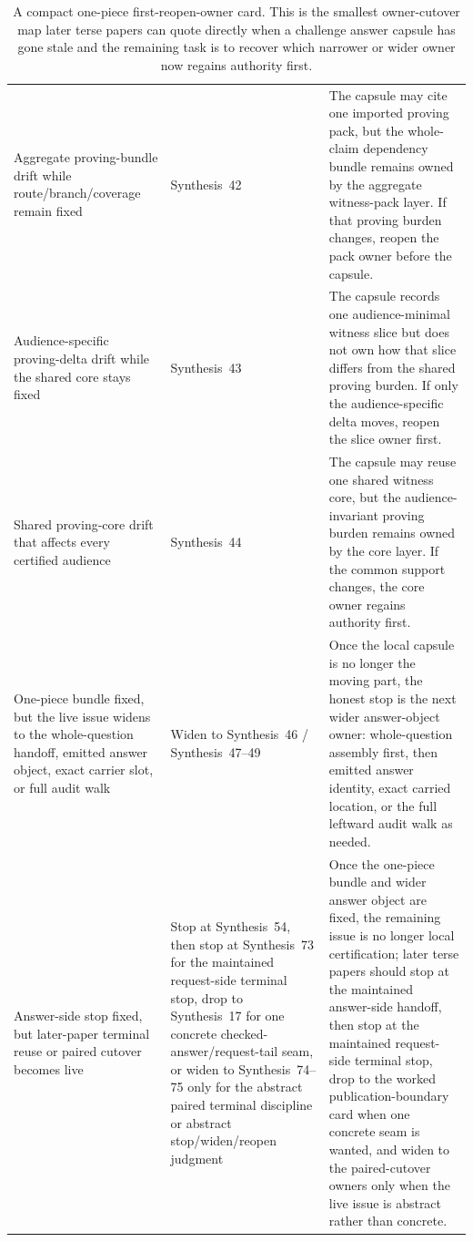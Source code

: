 \documentclass[11pt]{article}
\begin{document}
\begin{table}[t]
\begin{tabularx}{\linewidth}{@{}Y Y Y@{}}
Aggregate proving-bundle drift while route/branch/coverage remain fixed & Synthesis~42 & The capsule may cite one imported proving pack, but the whole-claim dependency bundle remains owned by the aggregate witness-pack layer. If that proving burden changes, reopen the pack owner before the capsule. \\
Audience-specific proving-delta drift while the shared core stays fixed & Synthesis~43 & The capsule records one audience-minimal witness slice but does not own how that slice differs from the shared proving burden. If only the audience-specific delta moves, reopen the slice owner first. \\
Shared proving-core drift that affects every certified audience & Synthesis~44 & The capsule may reuse one shared witness core, but the audience-invariant proving burden remains owned by the core layer. If the common support changes, the core owner regains authority first. \\
One-piece bundle fixed, but the live issue widens to the whole-question handoff, emitted answer object, exact carrier slot, or full audit walk & Widen to Synthesis~46 / Synthesis~47--49 & Once the local capsule is no longer the moving part, the honest stop is the next wider answer-object owner: whole-question assembly first, then emitted answer identity, exact carried location, or the full leftward audit walk as needed. \\
Answer-side stop fixed, but later-paper terminal reuse or paired cutover becomes live & Stop at Synthesis~54, then stop at Synthesis~73 for the maintained request-side terminal stop, drop to Synthesis~17 for one concrete checked-answer/request-tail seam, or widen to Synthesis~74--75 only for the abstract paired terminal discipline or abstract stop/widen/reopen judgment & Once the one-piece bundle and wider answer object are fixed, the remaining issue is no longer local certification; later terse papers should stop at the maintained answer-side handoff, then stop at the maintained request-side terminal stop, drop to the worked publication-boundary card when one concrete seam is wanted, and widen to the paired-cutover owners only when the live issue is abstract rather than concrete. \\
\bottomrule
\end{tabularx}
\caption{A compact one-piece first-reopen-owner card. This is the smallest owner-cutover map later terse papers can quote directly when a challenge answer capsule has gone stale and the remaining task is to recover which narrower or wider owner now regains authority first.}
\label{tab:answercapsule-first-reopen-owner-card}
\end{table}
\end{document}
